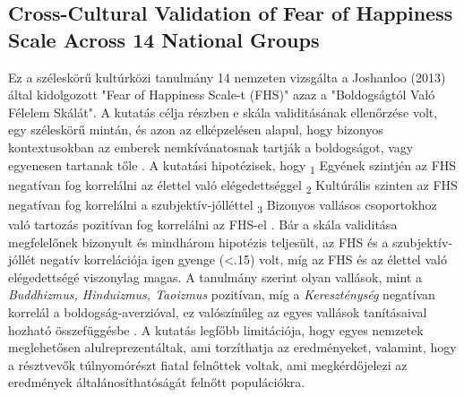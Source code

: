 \subsection{Cross-Cultural Validation of
	Fear of Happiness Scale Across 14 National Groups \cite{joshanloo_lepshokova_panyusheva_natalia_poon_yeung_sundaram_achoui_asano_igarashi}}
Ez a széleskörű kultúrközi tanulmány 14 nemzeten vizsgálta a Joshanloo (2013) által kidolgozott "Fear of Happiness Scale-t (FHS)" azaz a "Boldogságtól Való Félelem Skálát". A kutatás célja részben e skála validitásának ellenőrzése volt, egy széleskörű mintán, és azon az elképzelésen alapul, hogy bizonyos kontextusokban az emberek nemkívánatosnak tartják a boldogságot, vagy egyenesen tartanak tőle \cite{joshanloo_lepshokova_panyusheva_natalia_poon_yeung_sundaram_achoui_asano_igarashi}. A kutatási hipotézisek, hogy \textsubscript{1} Egyének szintjén az FHS negatívan fog korrelálni az élettel való elégedettséggel \textsubscript{2} Kultúrális szinten az FHS negatívan fog korrelálni a szubjektív-jólléttel \textsubscript{3} Bizonyos vallásos csoportokhoz való tartozás pozitívan fog korrelálni az FHS-el \cite{joshanloo_lepshokova_panyusheva_natalia_poon_yeung_sundaram_achoui_asano_igarashi}. Bár a skála validitása megfelelőnek bizonyult és mindhárom hipotézis teljesült, az FHS és a szubjektív-jóllét negatív korrelációja igen gyenge (\textless.15) volt, míg az FHS és az élettel való elégedettségé viszonylag magas. A tanulmány szerint olyan vallások, mint a \textit{Buddhizmus, Hinduizmus, Taoizmus} pozitívan, míg a \textit{Kereszténység} negatívan korrelál a boldogság-averzióval, ez valószínűleg az egyes vallások tanításaival hozható összefüggésbe \cite{joshanloo_lepshokova_panyusheva_natalia_poon_yeung_sundaram_achoui_asano_igarashi}. A kutatás legfőbb limitációja, hogy egyes nemzetek meglehetősen alulreprezentáltak, ami torzíthatja az eredményeket, valamint, hogy a résztvevők túlnyomórészt fiatal felnőttek voltak, ami megkérdőjelezi az eredmények általánosíthatóságát felnőtt populációkra.


